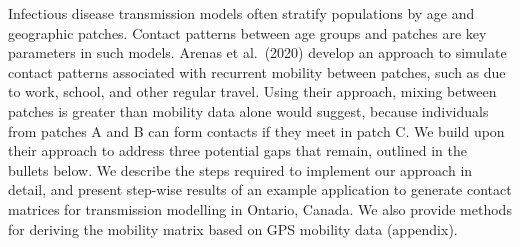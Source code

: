 Infectious disease transmission models often stratify populations by age and geographic patches.
Contact patterns between age groups and patches are key parameters in such models.
Arenas et al.\ (2020) develop an approach to simulate contact patterns associated with
recurrent mobility between patches, such as due to work, school, and other regular travel.
Using their approach, mixing between patches is greater than mobility data alone would suggest,
because individuals from patches A and B can form contacts if they meet in patch C.
We build upon their approach to address three potential gaps that remain, outlined in the bullets below.
We describe the steps required to implement our approach in detail,
and present step-wise results of an example application
to generate contact matrices for \sarscovii transmission modelling in Ontario, Canada.
We also provide methods for deriving the mobility matrix based on GPS mobility data (appendix).
